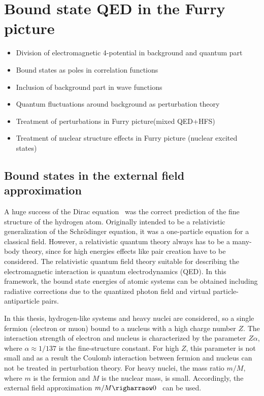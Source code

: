 \chapter{Bound state QED in the Furry picture}
\label{ch:furry_pic}
\begin{itemize}
\item Division of electromagnetic 4-potential in background and quantum part
\item Bound states as poles in correlation functions
\item Inclusion of background part in wave functions
\item Quantum fluctuations around background as perturbation theory
\item Treatment of perturbations in Furry picture(mixed QED+HFS)
\item Treatment of nuclear structure effects in Furry picture (nuclear excited states)
\end{itemize} 
\section{Bound states in the external field approximation}
A huge success of the Dirac equation~\cite{dirac1928} was the correct prediction of the fine structure of the hydrogen atom. Originally intended to be a relativistic generalization of the Schrödinger equation, it was a one-particle equation for a classical field. 
However, a relativistic quantum theory always has to be a many-body theory, since for high energies effects like pair creation have to be considered. The relativistic quantum field theory suitable for describing the electromagnetic interaction is quantum electrodynamics (QED). In this framework, the bound state energies of atomic systems can be obtained including radiative corrections due to the quantized photon field and virtual particle-antiparticle pairs. 

In this thesis, hydrogen-like systems and heavy nuclei are considered, so a single fermion (electron or muon) bound to a nucleus with a high charge number $Z$. The interaction strength of electron and nucleus is characterized by the parameter $Z\alpha$, where $\alpha \approx 1/137$ is the fine-structure constant. For high $Z$, this parameter is not small and as a result the Coulomb interaction between fermion and nucleus can not be treated in perturbation theory. 
For heavy nuclei, the mass ratio $m/M$, where $m$ is the fermion and $M$ is the nuclear mass, is small. Accordingly, the external field approximation $m/M \righarraow 0$~\cite[sec.~13.6]{weinberg2005} can be used.

